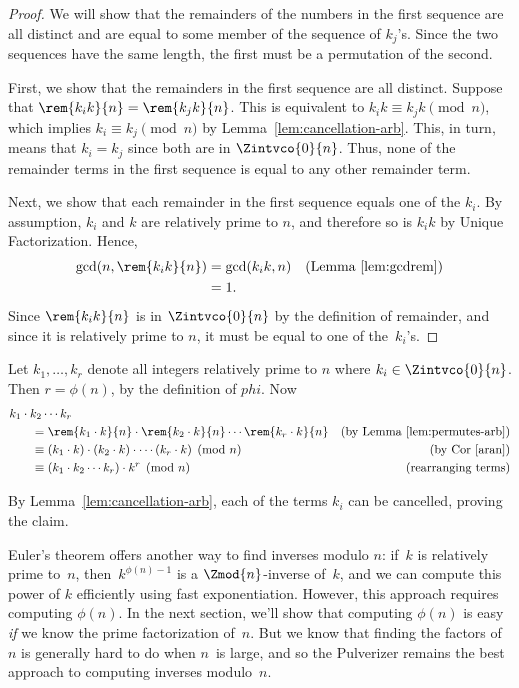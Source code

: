 \begin{proof}
We will show that the remainders of the numbers in the first sequence
are all distinct and are equal to some member of the sequence of
$k_j$'s.  Since the two sequences have the same length, the first must
be a permutation of the second.

First, we show that the remainders in the first sequence are all
distinct.  Suppose that $\rem{k_i k}{n} = \rem{k_j k}{n}$.  This is
equivalent to $k_i k \equiv k_j k \pmod{n}$, which implies $k_i \equiv
k_j \pmod{n}$ by Lemma~\ref{lem:cancellation-arb}.  This, in turn,
means that $k_i = k_j$ since both are in $\Zintvco{0}{n}$.  Thus, none
of the remainder terms in the first sequence is equal to any other
remainder term.

Next, we show that each remainder in the first sequence equals one of
the $k_i$.  By assumption, $k_i$ and $k$ are relatively prime to $n$,
and therefore so is $k_ik$ by Unique Factorization.  Hence,
\begin{align*}
\gcd(n, \rem{k_i k}{n}) & = \gcd(k_i k, n)
            & \text{(Lemma~\ref{lem:gcdrem})}\\
      & = 1.
\end{align*}
Since $\rem{k_i k}{n}$ is in $\Zintvco{0}{n}$ by the definition of remainder,
  and since it is relatively prime to $n$, it must be equal to one of
  the~$k_i$'s.
\end{proof}

Let $k_1, \dots, k_r$ denote all integers relatively prime to $n$
where $k_i \in \Zintvco{0}{n}$.  Then $r = \phi(n)$, by the definition of
  $phi$.  Now
\begin{align*}
\lefteqn{k_1 \cdot k_2 \cdots k_r} \hspace{0.25in} \\
  & = \rem{k_1 \cdot k}{n} \cdot \rem{k_2 \cdot k}{n} \cdots \rem{k_r \cdot k}{n}
      & \text{(by Lemma~\ref{lem:permutes-arb})}\\
  & \equiv (k_1 \cdot k) \cdot (k_2 \cdot k) \cdot \cdots (k_r \cdot k) \pmod{n}
      & \text{(by Cor~\ref{aran})}\\
  & \equiv (k_1 \cdot k_2 \cdots k_r) \cdot k^r \pmod{n}
      & \text{(rearranging terms)}
\end{align*}

By Lemma~\ref{lem:cancellation-arb}, each of the terms $k_i$ can be
cancelled, proving the claim.
\fi

\medskip
Euler's theorem offers another way to find inverses modulo
$n$: if~$k$ is relatively prime to~$n$, then~$k^{\phi(n)-1}$ is a
$\Zmod{n}$-inverse of~$k$, and we can compute this power of $k$
efficiently using fast exponentiation.  However, this approach
requires computing $\phi(n)$.  In the next section, we'll show that
computing $\phi(n)$ is easy \emph{if} we know the prime factorization
of~$n$.  But we know that finding the factors of~$n$ is generally hard
to do when $n$~is large, and so the Pulverizer remains the best
approach to computing inverses modulo~$n$.

